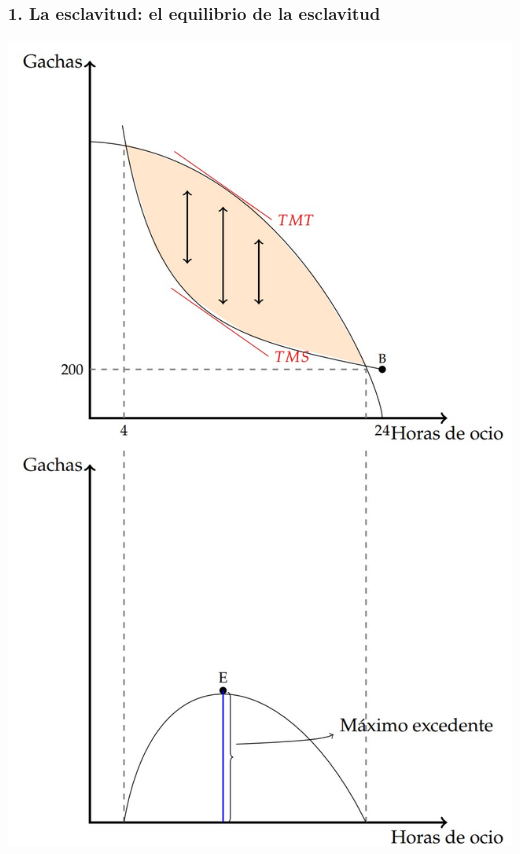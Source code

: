 \documentclass{beamer}
\begin{document}
\begin{frame}
\frametitle{1. La esclavitud: el equilibrio de la esclavitud}
\centering
\centering
\includegraphics[scale=0.55]{Slides Principios de Economia/Figures/Instituciones1.jpg}
\end{frame}
\end{document}
